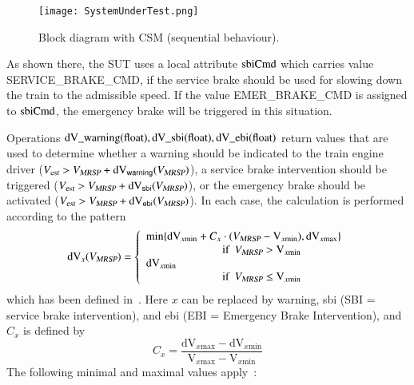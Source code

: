  \begin{figure}[htbp]
\centering
\texttt{[image: SystemUnderTest.png]}
\caption{Block diagram with CSM (sequential behaviour).}
 \label{fig:sutcomposite}
 \end{figure}



As shown there, the SUT uses a local attribute $\text{sbiCmd}$ which 
carries value SERVICE\_BRAKE\_CMD, if the service
brake should be used for slowing down the train to the admissible
speed. If the value EMER\_BRAKE\_CMD is assigned to 
$\text{sbiCmd}$, the emergency brake will be triggered in this situation.

Operations $\text{dV\_warning(float)}, \text{dV\_sbi(float)}, \text{dV\_ebi(float)}$ return values that are used to
determine whether a warning should be indicated to the train engine
driver (${V_{\text{\sl est}}} > {V_{\text{\sl MRSP}}}+\text{dV}_{\mathsf{warning}}({V_{\text{\sl MRSP}}})$), a service brake intervention should be
triggered (${V_{\text{\sl est}}} > {V_{\text{\sl MRSP}}}+\text{dV}_{\mathsf{sbi}}({V_{\text{\sl MRSP}}})$), or the emergency brake should be
activated (${V_{\text{\sl est}}} > {V_{\text{\sl MRSP}}}+\text{dV}_{\mathsf{ebi}}({V_{\text{\sl MRSP}}})$).  In each case, the calculation is performed
according to the pattern
\begin{equation}\label{eq:dvcalc}
\text{dV}_x(\vmax) = \left\{
\begin{array}{l}
\min\{\text{dV}_{x\text{min}} + C_x\cdot(\vmax-\text{V}_{x\text{min}}) ,\text{dV}_{x\text{max}} \}  \\\tabh   \text{if}\ \ \vmax > \text{V}_{x\text{min}} \\
\text{dV}_{x\text{min}}  
\\\tabh    \text{if}\ \ \vmax\le  \text{V}_{x\text{min}} \\
\end{array}
\right.
\end{equation}
which has been defined in~\cite[3.13.9.2.3]{ETCSSRS-Principles}. Here $x$ can be replaced by {\sf warning}, {\sf sbi} (SBI = service brake intervention), and {\sf ebi} (EBI = Emergency Brake Intervention), and $C_x$ is defined by 
$$
C_x = \frac{\text{dV}_{x\text{max}} - \text{dV}_{x\text{min}}}{\text{V}_{x\text{max}} - \text{V}_{x\text{min}}}
$$
The following minimal and maximal values apply~\cite[A.3.1]{ETCSSRS-Principles}:


